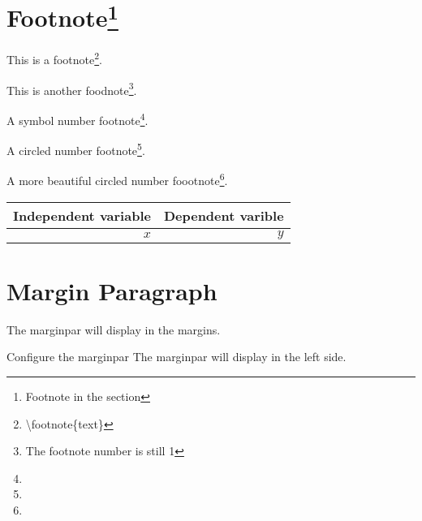 \documentclass{article}
\begin{document}
    \section{Footnote\protect\footnote{Footnote in the section}}
        This is a footnote\footnote{\textbackslash footnote\{text\}}. \par
        This is another foodnote\footnote[1]{The footnote number is still 1}. \par
        \renewcommand\thefootnote{\fnsymbol{footnote}}
        A symbol number footnote\footnote{}. \par
        \renewcommand\thefootnote{\textcircled{\arabic{footnote}}}
        A circled number footnote\footnote{}. \par
        \renewcommand\thefootnote{\ding{\numexpr171+\value{footnote}}}
        A more beautiful circled number foootnote\footnote{}. \par
        \begin{tabular}{r|r}
            Independent variable & Dependent varible\footnotemark \\
            \hline
            $x$ & $y$
        \end{tabular}
    \section{Margin Paragraph}
        The marginpar will display in the margins. \par
        Configure the marginpar
        {
            \reversemarginpar
            The marginpar will display in the left side. 
        }
\end{document}
